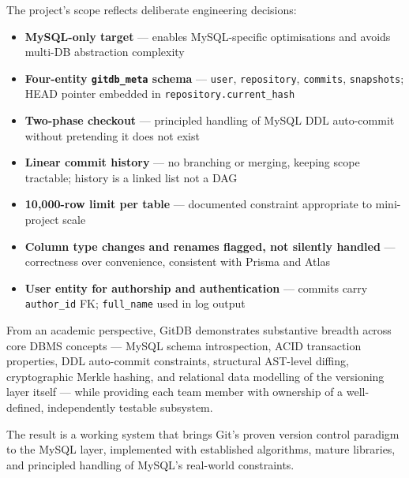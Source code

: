 \documentclass[12pt, a4paper]{article}
\begin{document}
The project's scope reflects deliberate engineering decisions:

\begin{itemize}[leftmargin=1.5em, itemsep=0.3em]
    \item \textbf{MySQL-only target} --- enables MySQL-specific optimisations
    and avoids multi-DB abstraction complexity
    \item \textbf{Four-entity \texttt{gitdb\_meta} schema} --- \texttt{user},
    \texttt{repository}, \texttt{commits}, \texttt{snapshots}; HEAD pointer
    embedded in \texttt{repository.current\_hash}
    \item \textbf{Two-phase checkout} --- principled handling of MySQL DDL
    auto-commit without pretending it does not exist
    \item \textbf{Linear commit history} --- no branching or merging, keeping
    scope tractable; history is a linked list not a DAG
    \item \textbf{10,000-row limit per table} --- documented constraint
    appropriate to mini-project scale
    \item \textbf{Column type changes and renames flagged, not silently handled}
    --- correctness over convenience, consistent with Prisma and Atlas
    \item \textbf{User entity for authorship and authentication} --- commits
    carry \texttt{author\_id} FK; \texttt{full\_name} used in log output
\end{itemize}

From an academic perspective, GitDB demonstrates substantive breadth across core
DBMS concepts --- MySQL schema introspection, ACID transaction properties, DDL
auto-commit constraints, structural AST-level diffing, cryptographic Merkle
hashing, and relational data modelling of the versioning layer itself --- while
providing each team member with ownership of a well-defined, independently
testable subsystem.

The result is a working system that brings Git's proven version control paradigm
to the MySQL layer, implemented with established algorithms, mature libraries,
and principled handling of MySQL's real-world constraints.
\end{document}
